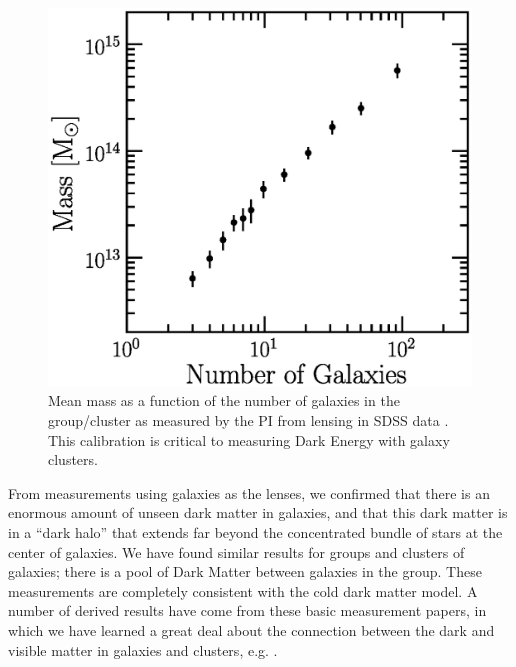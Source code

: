 \documentclass[12pt]{article}
\begin{document}
\begin{figure}[p]
\centering
\includegraphics[scale=0.7]{mass-rich-plot.eps}
\caption{Mean mass as a function of the number of
galaxies in the group/cluster as measured by the PI from lensing in SDSS
data \cite{SheldonLensing07,JohnstonLensing07}. This calibration
is critical to measuring Dark Energy with galaxy clusters.\label{fig:massngals}}
\end{figure}




From measurements using galaxies as the lenses, we confirmed that there is an
enormous amount of unseen dark matter in galaxies, and that this dark matter is
in a ``dark halo'' that extends far beyond the concentrated bundle of stars at
the center of galaxies.  We have found similar results for groups and clusters
of galaxies; there is a pool of Dark Matter between galaxies in the group.
These measurements are completely consistent with the cold dark matter model.
A number of derived results have come from these basic measurement papers, in
which we have learned a great deal about the connection between the dark and
visible matter in galaxies and clusters, e.g.
\cite{RykoffLXM08,RozoScatter09,TinkerM2N2012}. 
\end{document}

